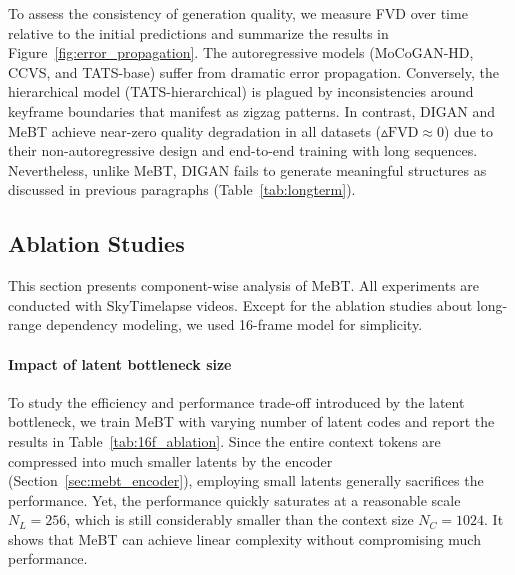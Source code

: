\documentclass[10pt,twocolumn,letterpaper]{article}
\newcommand{\cutparagraphup}{\vspace*{-0.1in}}
\begin{document}
To assess the consistency of generation quality, we measure FVD over time relative to the initial predictions and summarize the results in Figure~\ref{fig:error_propagation}.
The autoregressive models (MoCoGAN-HD, CCVS, and TATS-base) suffer from dramatic error propagation. Conversely, the hierarchical model (TATS-hierarchical) is plagued by inconsistencies around keyframe boundaries that manifest as zigzag patterns. In contrast, DIGAN and MeBT achieve near-zero quality degradation in all datasets ($\vartriangle \text{FVD}\approx 0$) due to their non-autoregressive design and end-to-end training with long sequences. Nevertheless, unlike MeBT, DIGAN fails to generate meaningful structures as discussed in previous paragraphs (Table~\ref{tab:longterm}).

\subsection{Ablation Studies}
\label{sec:ablation_study}
This section presents component-wise analysis of MeBT. 
All experiments are conducted with SkyTimelapse videos. Except for the ablation studies about long-range dependency modeling, we used 16-frame model for simplicity.

\cutparagraphup
\paragraph{Impact of latent bottleneck size}
To study the efficiency and performance trade-off introduced by the latent bottleneck, we train MeBT with varying number of latent codes and report the results in Table~\ref{tab:16f_ablation}.
Since the entire context tokens are compressed into much smaller latents by the encoder (Section~\ref{sec:mebt_encoder}), employing small latents generally sacrifices the performance. 
Yet, the performance quickly saturates at a reasonable scale $N_L=256$, which is still considerably smaller than the context size $N_C=1024$.
It shows that MeBT can achieve linear complexity without compromising much performance.



\iffalse
Fig.\ref{fig:latent_bottleneck} shows the change of FVD over the training memory cost by controlling the size of the latent bottleneck. 
By increasing the size of the latent bottleneck, the model's performance increases at the cost of efficiency. 
Interestingly, the performance of the model seems to be saturated when $N_L \geq 256$. 
This indicates that the context can be expressed with fewer tokens. 
When modeling a 16-frame video expressed with 1024 tokens, only 256 tokens corresponding to a 4-frame clip was enough to express the context.
\fi
\end{document}
